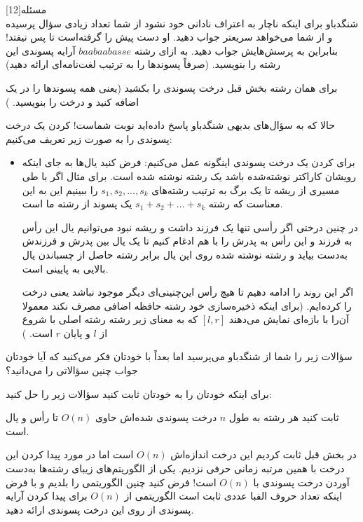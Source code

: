 ‌مسئله[12]  
\\
شنگدباو برای اینکه ناچار به اعتراف نادانی خود نشود از شما تعداد زیادی سؤال پرسیده و از شما می‌خواهد سریعتر جواب دهید. او دست پیش‌ را گرفته‌است تا پس نیفتد! بنابراین به پرسش‌هایش جواب دهید.
به ازای رشته
$baabaabasse$
آرایه پسوندی این رشته را بنویسید. (صرفاً پسوندها را به ترتیب لغت‌نامه‌ای ارائه دهید)

برای همان رشته بخش قبل درخت پسوندی را بکشید (یعنی همه پسوند‌ها را در یک 
اضافه کنید و درخت را بنویسید.
)

حالا که به سؤال‌های بدیهی شنگدباو پاسخ داده‌اید نوبت شماست! 
کردن یک درخت پسوندی را به صورت زیر تعریف می‌کنیم:
\begin{itemize}
	\item 
	برای 
	کردن یک درخت پسوندی اینگونه عمل می‌کنیم: فرض کنید یال‌ها به جای اینکه رویشان کاراکتر نوشته‌شده باشد یک رشته نوشته شده است. برای مثال اگر با طی مسیری از ریشه تا یک برگ به ترتیب رشته‌های
	$s_1, s_2, ..., s_k$
	را ببینیم این به این معناست که رشته‌
	$s_1 + s_2 + ... + s_k$
	یک پسوند از رشته ما است.
	
	در چنین درختی اگر رأسی تنها یک فرزند داشت و ریشه نبود می‌توانیم یال این رأس به فرزند و این رأس به پدرش را با هم ادغام کنیم تا یک یال بین پدرش و فرزندش به‌دست بیاید و رشته نوشته شده روی این یال برابر رشته حاصل از چسباندن یال بالایی به پایینی است.
	
	اگر این روند را ادامه دهیم تا هیچ رأس این‌چنینی‌‌ای دیگر موجود نباشد یعنی درخت را 
	کرده‌ایم. (برای اینکه ذخیره‌سازی خود رشته حافظه اضافی مصرف نکند معمولا آن‌را با بازه‌ای نمایش می‌دهند 
	$[l,r]$
	که به معنای زیر رشته رشته‌ اصلی با شروع از $l$ و پایان $r$ است.
	)
\end{itemize}

سؤالات زیر را شما از شنگدباو می‌پرسید اما بعداً با خودتان فکر می‌کنید که آیا خودتان جواب چنین سؤالاتی را می‌دانید؟

برای اینکه خودتان را به خودتان ثابت کنید سؤالات زیر را حل کنید:

ثابت کنید هر رشته به طول $n$ درخت پسوندی 
شده‌اش حاوی 
$O(n)$
تا رأس و یال است.

در بخش قبل ثابت کردیم این درخت اندازه‌اش
$O(n)$
است اما در مورد پیدا کردن این درخت با همین مرتبه زمانی حرفی نزدیم.
یکی از الگوریتم‌های زیبای رشته‌ها به‌دست آوردن درخت پسوندی با 
$O(n)$
است! فرض کنید چنین الگوریتمی را بلدیم و با فرض اینکه تعداد حروف الفبا عددی ثابت است الگوریتمی از 
$O(n)$
برای پیدا کردن آرایه پسوندی از روی این درخت پسوندی ارائه دهید. 


